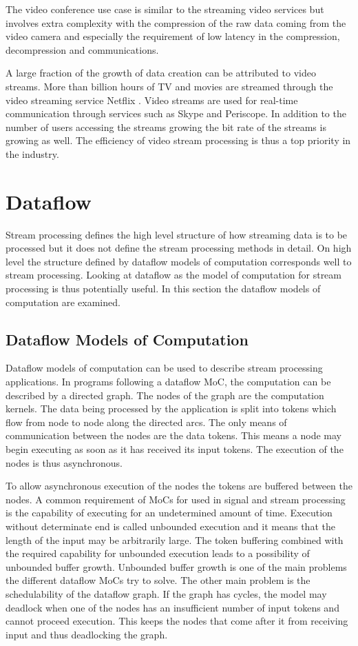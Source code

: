 The video conference use case is similar to the streaming video services but involves extra complexity with the compression of the raw data coming from the video camera and especially the requirement of low latency in the compression, decompression and communications.

A large fraction of the growth of data creation can be attributed to video streams. More than billion hours of TV and movies are streamed through the video streaming service Netflix \cite{turner2014digital}. Video streams are used for real-time communication through services such as Skype and Periscope. In addition to the number of users accessing the streams growing the bit rate of the streams is growing as well. The efficiency of video stream processing is thus a top priority in the industry.

\section{Dataflow}
\label{sec:dataflow-models}
Stream processing defines the high level structure of how streaming data is to be processed but it does not define the stream processing methods in detail. On high level the structure defined by dataflow models of computation corresponds well to stream processing. Looking at dataflow as the model of computation for stream processing is thus potentially useful. In this section the dataflow models of computation are examined.

\subsection{Dataflow Models of Computation}
\label{subsec:dataflow-moc}
Dataflow models of computation can be used to describe stream processing applications. In programs following a dataflow MoC, the computation can be described by a directed graph. The nodes of the graph are the computation kernels. The data being processed by the application is split into tokens which flow from node to node along the directed arcs. The only means of communication between the nodes are the data tokens. This means a node may begin executing as soon as it has received its input tokens. The execution of the nodes is thus asynchronous.~\cite{lee2015introduction}

To allow asynchronous execution of the nodes the tokens are buffered between the nodes. A common requirement of MoCs for used in signal and stream processing is the capability of executing for an undetermined amount of time. Execution without determinate end is called unbounded execution and it means that the length of the input may be arbitrarily large. The token buffering combined with the required capability for unbounded execution leads to a possibility of unbounded buffer growth. Unbounded buffer growth is one of the main problems the different dataflow MoCs try to solve. The other main problem is the schedulability of the dataflow graph. If the graph has cycles, the model may deadlock when one of the nodes has an insufficient number of input tokens and cannot proceed execution. This keeps the nodes that come after it from receiving input and thus deadlocking the graph.~\cite{lee2015introduction}

